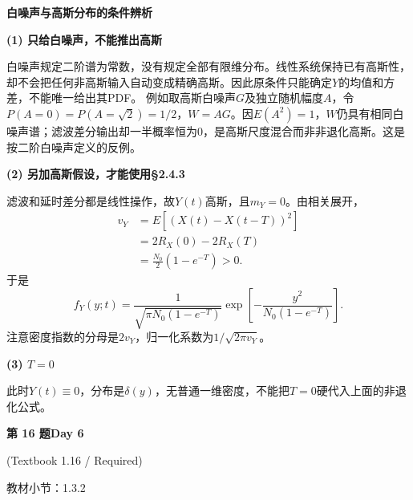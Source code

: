 \documentclass[10.5pt,fontset=fandol]{ctexart}
\newcommand{\key}[1]{\par\vspace{4pt}\noindent\textbf{\color{navy}#1}\par\vspace{2pt}}
\newcommand{\qtitle}[2]{\par\addvspace{1.2em}\Needspace{8\baselineskip}\begin{tcolorbox}[colback=navy,colframe=navy,arc=1.5pt,boxrule=0pt]\color{white}\large\bfseries #1\hfill\small #2\end{tcolorbox}}
\begin{document}
\noindent\textbf{白噪声与高斯分布的条件辨析}\par\smallskip\begin{tcolorbox}[breakable,colback=qbg,colframe=qbg,boxrule=0pt]\key{(1) 只给白噪声，不能推出高斯}
白噪声规定二阶谱为常数，没有规定全部有限维分布。线性系统保持已有高斯性，却不会把任何非高斯输入自动变成精确高斯。因此原条件只能确定$Y$的均值和方差，不能唯一给出其PDF。
例如取高斯白噪声$G$及独立随机幅度$A$，令$P(A=0)=P(A=\sqrt2)=1/2$，$W=AG$。因$E(A^2)=1$，$W$仍具有相同白噪声谱；滤波差分输出却一半概率恒为0，是高斯尺度混合而非非退化高斯。这是按二阶白噪声定义的反例。
\key{(2) 另加高斯假设，才能使用§2.4.3}
滤波和延时差分都是线性操作，故$Y(t)$高斯，且$m_Y=0$。由相关展开，
\[\begin{aligned}v_Y&=E[(X(t)-X(t-T))^2]\\&=2R_X(0)-2R_X(T)\\&=\boxed{\frac{N_0}{2}(1-e^{-T})}>0.\end{aligned}\]
于是
\[\boxed{f_Y(y;t)=\frac1{\sqrt{\pi N_0(1-e^{-T})}}\exp\!\left[-\frac{y^2}{N_0(1-e^{-T})}\right].}\]
注意密度指数的分母是$2v_Y$，归一化系数为$1/\sqrt{2\pi v_Y}$。
\key{(3) $T=0$}
此时$Y(t)\equiv0$，分布是$\delta(y)$，无普通一维密度，不能把$T=0$硬代入上面的非退化公式。

\end{tcolorbox}
\qtitle{第 16 题}{Day 6}
{\small\color{accentred}(Textbook 1.16 / Required)}\par\smallskip
{\small\color{muted}教材小节：1.3.2}\par\medskip
\end{document}
